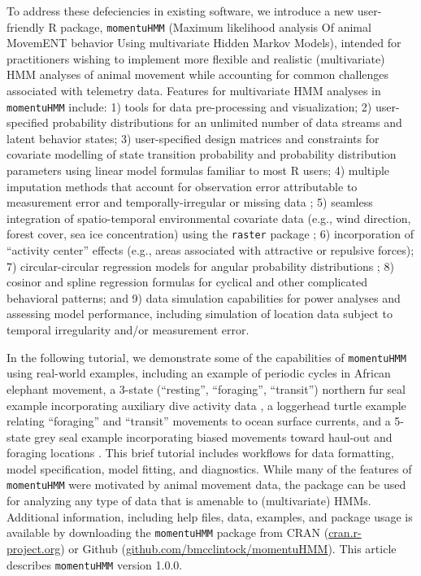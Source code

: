 \documentclass[12pt]{article}
\begin{document}
To address these defeciencies in existing software, we introduce a new user-friendly R package, \verb|momentuHMM| (Maximum likelihood analysis Of animal MovemENT behavior Using multivariate Hidden Markov Models), intended for practitioners wishing to implement more flexible and realistic (multivariate) HMM analyses of animal movement while accounting for common challenges associated with telemetry data. Features for multivariate HMM analyses in \verb|momentuHMM| include: 1) tools for data pre-processing and visualization; 2) user-specified probability distributions for an unlimited number of data streams and latent behavior states; 3) user-specified design matrices and constraints for covariate modelling of state transition probability and probability distribution parameters using linear model formulas familiar to most R users; 4) multiple imputation methods that account for observation error attributable to measurement error and temporally-irregular or missing data \citep{HootenEtAl2017,McClintock2017}; 5) seamless integration of spatio-temporal environmental covariate data (e.g., wind direction, forest cover, sea ice concentration) using the \verb|raster| package \citep{Hijmans2016}; 6) incorporation of ``activity center'' effects (e.g., areas associated with attractive or repulsive forces); 7) circular-circular regression models for angular probability distributions \citep{DuchesneEtAl2015}; 8) cosinor \citep[e.g.][]{Cornelissen2014} and spline regression formulas for cyclical and other complicated behavioral patterns; and 9) data simulation capabilities for power analyses and assessing model performance, including simulation of location data subject to temporal irregularity and/or measurement error.  

In the following tutorial, we demonstrate some of the capabilities of \verb|momentuHMM| using real-world examples, including an example of periodic cycles in African elephant movement, a 3-state (``resting'', ``foraging'', ``transit'') northern fur seal example incorporating auxiliary dive activity data \citep{McClintockEtAl2014b}, a loggerhead turtle example relating ``foraging'' and ``transit'' movements to ocean surface currents, and a 5-state grey seal example incorporating biased movements toward haul-out and foraging locations \citep{McClintockEtAl2012}. This brief tutorial includes workflows for data formatting, model specification, model fitting, and diagnostics. While many of the features of \verb|momentuHMM| were motivated by animal movement data, the package can be used for analyzing any type of data that is amenable to (multivariate) HMMs.  Additional information, including help files, data, examples, and package usage is available by downloading the \verb|momentuHMM| package from CRAN (\url{cran.r-project.org}) or Github (\url{github.com/bmcclintock/momentuHMM}). This article describes \verb|momentuHMM| version 1.0.0.
\end{document}
